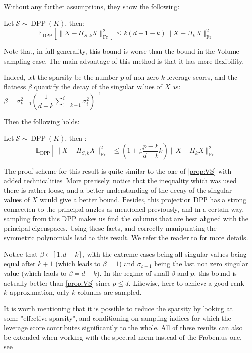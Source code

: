 Without any further assumptions, they show the following: 

\begin{proposition} 
    Let $\mathcal{S}\sim \operatorname{DPP}(K)$, then:
\begin{equation}
     \mathbb{E}_{\operatorname{DPP}} [ \lVert X - \Pi_{S,k}X \rVert_{\operatorname{Fr}}^2] \leq k(d+1-k) \lVert X - \Pi_kX \rVert_{\operatorname{Fr}}^2
\end{equation}
\end{proposition}

Note that, in full generality, this bound is worse than the bound in the Volume sampling case. The main advantage of this method is that it has more flexibility.

Indeed, let the sparsity be the number $p$ of non zero $k$ leverage scores, and the flatness $\beta$ quantify the decay of the singular values of $X$ as: $\beta = \sigma_{k+1}^2 (\dfrac{1}{d-k}\sum \limits_{i = k+1} ^d \sigma_i^2)^{-1}$

Then the following holds:

\begin{proposition} 
    Let $\mathcal{S} \sim \operatorname{DPP}(K)$, then :
\begin{equation}
\mathbb{E}_{\operatorname{DPP}} [ \lVert X - \Pi_{S,k}X \rVert_{\operatorname{Fr}}^2] \leq (1+\beta \dfrac{p-k}{d-k}k) \lVert X - \Pi_kX \rVert_{\operatorname{Fr}}^2 
\end{equation}

\end{proposition}

The proof scheme for this result is quite similar to the one of \ref{prop:VS} with added technicalities. More precisely, notice that the inequality which was used there is rather loose, and a better understanding of the decay of the singular values of $X$ would give a better bound. Besides, this projection DPP has a strong connection to the principal angles as mentioned previously, and in a certain way, sampling from this DPP makes us find the columns that are best aligned with the principal eigenspaces. Using these facts, and correctly manipulating the symmetric polynomials lead to this result. We refer the reader to \cite{belhadji_determinantal_2020} for more details.

Notice that $ \beta \in [1,d-k]$, with the extreme cases being all singular values being equal after $k+1$ (which leads to $\beta =1$) and $\sigma_{k+1}$ being the last non zero singular value (which leads to $\beta = d-k$). 
In the regime of small $\beta$ and $p$, this bound is actually better than \ref{prop:VS} since $p\leq d$. Likewise, here to achieve a good rank $k$ approximation, only $k$ columns are sampled.

It is worth mentioning that it is possible to reduce the sparsity by looking at some "effective sparsity", and conditioning on sampling indices for which the leverage score contributes significantly to the whole. All of these results can also be extended when working with the spectral norm instead of the Frobenius one, see \cite{belhadji_determinantal_2020}.
